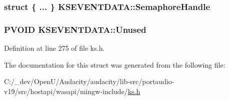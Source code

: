 \subsubsection[{\texorpdfstring{Semaphore\+Handle}{SemaphoreHandle}}]{\setlength{\rightskip}{0pt plus 5cm}struct \{ ... \}   K\+S\+E\+V\+E\+N\+T\+D\+A\+T\+A\+::\+Semaphore\+Handle}\hypertarget{struct_k_s_e_v_e_n_t_d_a_t_a_a2a78d38ca4f8a7fa4830b9805ae52b47}{}\label{struct_k_s_e_v_e_n_t_d_a_t_a_a2a78d38ca4f8a7fa4830b9805ae52b47}
\subsubsection[{\texorpdfstring{Unused}{Unused}}]{\setlength{\rightskip}{0pt plus 5cm}P\+V\+O\+ID K\+S\+E\+V\+E\+N\+T\+D\+A\+T\+A\+::\+Unused}\hypertarget{struct_k_s_e_v_e_n_t_d_a_t_a_aa8f0264453d52333d3624402a5a139c8}{}\label{struct_k_s_e_v_e_n_t_d_a_t_a_aa8f0264453d52333d3624402a5a139c8}


Definition at line 275 of file ks.\+h.



The documentation for this struct was generated from the following file\+:\begin{DoxyCompactItemize}
\item 
C\+:/\+\_\+dev/\+Open\+U/\+Audacity/audacity/lib-\/src/portaudio-\/v19/src/hostapi/wasapi/mingw-\/include/\hyperlink{ks_8h}{ks.\+h}\end{DoxyCompactItemize}
